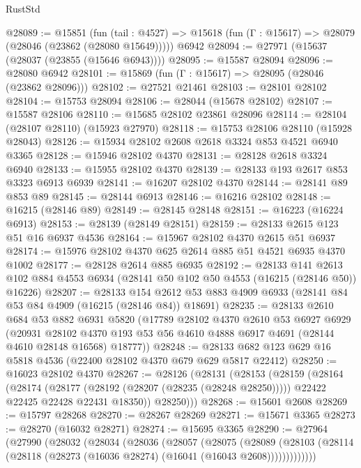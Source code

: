 \begin{lexlean}{RustStd}
\begin{coremodule}
@28089 := @15851
    (fun (tail : @4527) => @15618 (fun (Γ : @15617) => @28079 (@28046 (@23862 (@28080 @15649)))))
    @6942
@28094 := @27971 (@15637 (@28037 (@23855 (@15646 @6943))))
@28095 := @15587 @28094
@28096 := @28080 @6942
@28101 := @15869 (fun (Γ : @15617) => @28095 (@28046 (@23862 @28096)))
@28102 := @27521 @21461
@28103 := @28101 @28102
@28104 := @15753 @28094
@28106 := @28044 (@15678 @28102)
@28107 := @15587 @28106
@28110 := @15685 @28102 @23861 @28096
@28114 := @28104 (@28107 @28110) (@15923 @27970)
@28118 := @15753 @28106 @28110 (@15928 @28043)
@28126 := @15934 @28102 @2608 @2618 @3324 @853 @4521 @6940 @3365
@28128 := @15946 @28102 @4370
@28131 := @28128 @2618 @3324 @6940
@28133 := @15955 @28102 @4370
@28139 := @28133 @193 @2617 @853 @3323 @6913 @6939
@28141 := @16207 @28102 @4370
@28144 := @28141 @89 @853 @89
@28145 := @28144 @6913
@28146 := @16216 @28102
@28148 := @16215 (@28146 @89)
@28149 := @28145 @28148
@28151 := @16223 (@16224 @6913)
@28153 := @28139 (@28149 @28151)
@28159 := @28133 @2615 @123 @51 @16 @6937 @4536
@28164 := @15967 @28102 @4370 @2615 @51 @6937
@28174 := @15976 @28102 @4370 @625 @2614 @885 @51 @4521 @6935 @4370 @1002
@28177 := @28128 @2614 @885 @6935
@28192 := @28133
    @141
    @2613
    @102
    @884
    @4553
    @6934
    (@28141 @50 @102 @50 @4553 (@16215 (@28146 @50)) @16226)
@28207 := @28133
    @154
    @2612
    @53
    @883
    @4909
    @6933
    (@28141 @84 @53 @84 @4909 (@16215 (@28146 @84)) @18691)
@28235 := @28133
    @2610
    @684
    @53
    @882
    @6931
    @5820
    (@17789
      @28102
      @4370
      @2610
      @53
      @6927
      @6929
      (@20931
        @28102
        @4370
        @193
        @53
        @56
        @4610
        @4888
        @6917
        @4691
        (@28144 @4610 @28148 @16568)
        @18777))
@28248 := @28133 @682 @123 @629 @16 @5818 @4536 (@22400 @28102 @4370 @679 @629 @5817 @22412)
@28250 := @16023 @28102 @4370
@28267 := @28126
    (@28131
      (@28153
        (@28159
          (@28164
            (@28174
              (@28177 (@28192 (@28207 (@28235 (@28248 @28250)))))
              @22422
              @22425
              @22428
              @22431
              @18350))
          @28250)))
@28268 := @15601 @2608
@28269 := @15797 @28268
@28270 := @28267 @28269
@28271 := @15671 @3365
@28273 := @28270 (@16032 @28271)
@28274 := @15695 @3365
@28290 := @27964
    (@27990
      (@28032
        (@28034
          (@28036
            (@28057
              (@28075
                (@28089
                  (@28103 (@28114 (@28118 (@28273 (@16036 @28274) (@16041 (@16043 @2608)))))))))))))

\end{coremodule}
\end{lexlean}

